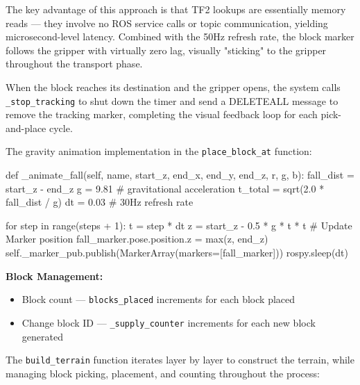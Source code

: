 \documentclass[12pt, a4paper]{article}
\begin{document}
The key advantage of this approach is that TF2 lookups are essentially memory reads — they involve no ROS service calls or topic communication, yielding microsecond-level latency. Combined with the 50Hz refresh rate, the block marker follows the gripper with virtually zero lag, visually "sticking" to the gripper throughout the transport phase.

When the block reaches its destination and the gripper opens, the system calls \texttt{\_stop\_tracking} to shut down the timer and send a DELETEALL message to remove the tracking marker, completing the visual feedback loop for each pick-and-place cycle.

The gravity animation implementation in the \texttt{place\_block\_at} function:

\begin{pythoncode}
def _animate_fall(self, name, start_z, end_x, end_y, end_z, r, g, b):
    fall_dist = start_z - end_z
    g = 9.81  # gravitational acceleration
    t_total = sqrt(2.0 * fall_dist / g)
    dt = 0.03  # 30Hz refresh rate
    
    for step in range(steps + 1):
        t = step * dt
        z = start_z - 0.5 * g * t * t
        # Update Marker position
        fall_marker.pose.position.z = max(z, end_z)
        self._marker_pub.publish(MarkerArray(markers=[fall_marker]))
        rospy.sleep(dt)
\end{pythoncode}

\textbf{Block Management:}

\begin{itemize}
    \item Block count — \texttt{blocks\_placed} increments for each block placed
    \item Change block ID — \texttt{\_supply\_counter} increments for each new block generated
\end{itemize}

The \texttt{build\_terrain} function iterates layer by layer to construct the terrain, while managing block picking, placement, and counting throughout the process:
\end{document}
